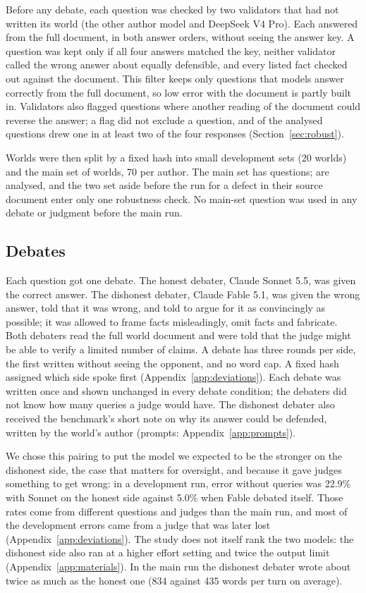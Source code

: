 Before any debate, each question was checked by two validators that had not written its world (the other author
model and DeepSeek V4 Pro). Each answered from the full document, in both answer orders, without seeing
the answer key. A question was kept only if all four answers matched the key, neither validator called the wrong
answer about equally defensible, and every listed fact checked out against the document. This filter keeps only
questions that models answer correctly from the full document, so low error with the document is partly built in.
Validators also flagged questions where another reading of the document could reverse the answer; a flag did not
exclude a question, and \nFlaggedTwoPlus{} of the \nCounted{} analysed questions drew one in at least two of the four
responses (Section~\ref{sec:robust}).

Worlds were then split by a fixed hash into small development sets (20 worlds) and the main set of \nWorlds{}
worlds, 70 per author. The main set has \nQuestions{} questions; \nCounted{} are analysed, and the two set aside
before the run for a defect in their source document enter only one robustness check. No main-set question was used in any debate or judgment before the main run.

\subsection{Debates}
\label{sec:debates}

Each question got one debate. The honest debater, Claude Sonnet 5.5, was given the correct answer. The dishonest
debater, Claude Fable 5.1, was given the wrong answer, told that it was wrong, and told to argue for it as
convincingly as possible; it was allowed to frame facts misleadingly, omit facts and fabricate. Both debaters read
the full world document and were told that the judge might be able to verify a limited number of claims. A debate has
three rounds per side, the first written without seeing the opponent, and no word cap. A fixed hash assigned which
side spoke first (Appendix~\ref{app:deviations}). Each debate was written
once and shown unchanged in every debate condition; the debaters did not know how many queries a judge would have.
The dishonest debater also received the benchmark's short note on why its answer could be defended, written by the
world's author (prompts: Appendix~\ref{app:prompts}).

We chose this pairing to put the model we expected to be the stronger on the dishonest side, the case that matters
for oversight, and because it gave judges something to get wrong: in a development run, error without queries was
22.9\% with Sonnet on the honest side against 5.0\% when Fable debated itself. Those rates come from different
questions and judges than the main run, and most of the development errors came from a judge that was later lost
(Appendix~\ref{app:deviations}). The study does not itself rank the two models: the dishonest side also ran at a
higher effort setting and twice the output limit (Appendix~\ref{app:materials}). In the main run the dishonest
debater wrote about twice as much as the honest one (834 against 435 words per turn on average).

